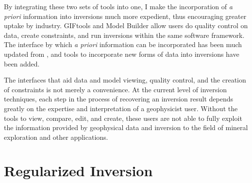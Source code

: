 By integrating these two sets of tools into one, I make the incorporation of \emph{a priori} information into inversions much more expedient, thus encouraging greater uptake by industry.  GIFtools and Model Builder allow users do quality control on data, create constraints, and run inversions within the same software framework. The interface by which \emph{a priori} information can be incorporated has been much updated from \cite{williams2008geologically}, and tools to incorporate new forms of data into inversions have been added. 

The interfaces that aid data and model viewing, quality control, and the creation of constraints is not merely a convenience. At the current level of inversion techniques, each step in the process of recovering an inversion result depends greatly on the expertise and interpretation of a geophysicist user. Without the tools to view, compare, edit, and create, these users are not able to fully exploit the information provided by geophysical data and inversion to the field of mineral exploration and other applications.



\section{Regularized Inversion}
\label{sec:Regularized Inversion}

